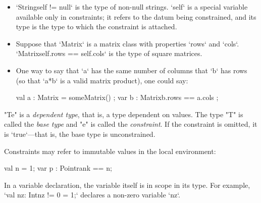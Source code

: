 \begin{ex}

\begin{itemize}
\item \xcd`String{self != null}` is the type of non-null strings.  \xcd`self`
      is a special variable available only in constraints; it refers to the
      datum being constrained, and its type is the type to which the
      constraint is attached.
\item Suppose that \xcd`Matrix` is a matrix class with  properties \xcd`rows`
      and \xcd`cols`.  
      \xcd`Matrix{self.rows == self.cols}` is the type of square matrices.
\item One way to say that \xcd`a` has the same number of columns that \xcd`b`
      has rows (so that \xcd`a*b` is a valid matrix product), one could say: 
\begin{xten}
  val a : Matrix = someMatrix() ;
  var b : Matrix{b.rows == a.cols} ;
\end{xten}
\end{itemize}
\end{ex}



\xcd"T{e}" is a {\em dependent type}, that is, a type dependent on values. The
type \xcd"T" is called the {\em base type} and \xcd"e" is called the {\em
  constraint}. If the constraint is omitted, it is \xcd`true`---that is, the
  base type is unconstrained.

Constraints may refer to immutable values in the local environment: 
\begin{xten}
     val n = 1;
     var p : Point{rank == n};
\end{xten}
In a variable declaration, the variable itself is in scope in its
type. For example, \xcd`val nz: Int{nz != 0} = 1;` declares a
non-zero variable \xcd`nz`.

